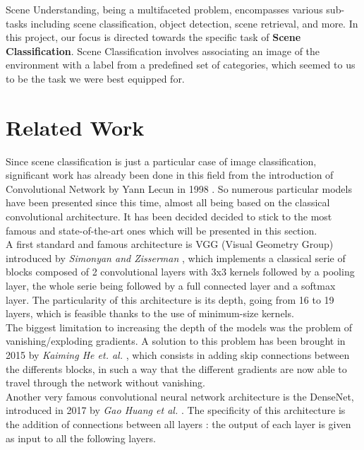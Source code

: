\documentclass[twocolumn,superscriptaddress,aps]{revtex4-1}
\begin{document}
Scene Understanding, being a multifaceted problem, encompasses various sub-tasks including scene classification, object detection, scene retrieval, and more. In this project, our focus is directed towards the specific task of \textbf{Scene Classification}. Scene Classification involves associating an image of the environment with a label from a predefined set of categories, which seemed to us to be the task we were best equipped for.


\section{Related Work}

Since scene classification is just a particular case of image classification, significant work has already been done in this field from the introduction of Convolutional Network by Yann Lecun in 1998 \cite{lecun_cnn} . So numerous particular models have been presented since this time, almost all being based on the classical convolutional architecture. It has been decided decided to stick  to the most famous and state-of-the-art ones which will be presented in this section. \\

A first standard and famous architecture is VGG (Visual Geometry Group) introduced by \textit{Simonyan and Zisserman} \cite{vgg}, which implements a classical serie of blocks composed of 2 convolutional layers with 3x3 kernels followed by a pooling layer, the whole serie being followed by a full connected layer and a softmax layer. The particularity of this architecture is its depth, going from 16 to 19 layers, which is feasible thanks to the use of minimum-size kernels. \\

The biggest limitation to increasing the depth of the models was the problem of vanishing/exploding gradients. A solution to this problem has been brought in 2015 by \textit{Kaiming He et. al.} \cite{resnet}, which consists in adding skip connections between the differents blocks, in such a way that the different gradients are now able to travel through the network without vanishing. \\

Another very famous convolutional neural network architecture is the DenseNet, introduced in 2017 by \textit{Gao Huang et al.} \cite{denset}. The specificity of this architecture is the addition of connections between all layers : the output of each layer is given as input to all the following layers. \\
\end{document}
